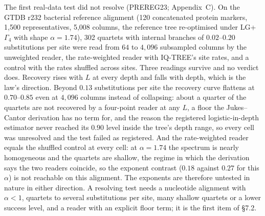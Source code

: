 \documentclass[11pt]{article}
\begin{document}
The first real-data test did not resolve (PREREG23; Appendix~C). On the GTDB r232 bacterial reference alignment (120 concatenated protein markers, 1,500 representatives, 5,008 columns, the reference tree re-optimised under LG+$\Gamma_4$ with shape $\alpha=1.74$), 302 quartets with internal branches of $0.02$--$0.20$ substitutions per site were read from $64$ to $4{,}096$ subsampled columns by the unweighted reader, the rate-weighted reader with IQ-TREE's site rates, and a control with the rates shuffled across sites. Three readings survive and no verdict does. Recovery rises with $L$ at every depth and falls with depth, which is the law's direction. Beyond $0.13$ substitutions per site the recovery curve flattens at $0.70$--$0.85$ even at $4{,}096$ columns instead of collapsing: about a quarter of the quartets are not recovered by a four-point reader at any $L$, a floor the Jukes--Cantor derivation has no term for, and the reason the registered logistic-in-depth estimator never reached its $0.90$ level inside the tree's depth range, so every cell was unresolved and the test failed as registered. And the rate-weighted reader equals the shuffled control at every cell: at $\alpha=1.74$ the spectrum is nearly homogeneous and the quartets are shallow, the regime in which the derivation says the two readers coincide, so the exponent contrast ($0.18$ against $0.27$ for this $\alpha$) is not reachable on this alignment. The exponents are therefore untested in nature in either direction. A resolving test needs a nucleotide alignment with $\alpha<1$, quartets to several substitutions per site, many shallow quartets or a lower success level, and a reader with an explicit floor term; it is the first item of \S7.2.
\end{document}
